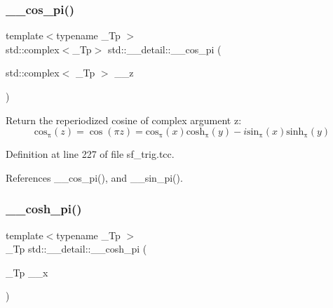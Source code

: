 \mbox{\label{namespacestd_1_1____detail_a0332c7fb29ed7be543103adc8d04d39d}} 
\subsubsection{\texorpdfstring{\+\_\+\+\_\+cos\+\_\+pi()}{\_\_cos\_pi()}\hspace{0.1cm}{\footnotesize\ttfamily [2/2]}}
{\footnotesize\ttfamily template$<$typename \+\_\+\+Tp $>$ \\
std\+::complex$<$\+\_\+\+Tp$>$ std\+::\+\_\+\+\_\+detail\+::\+\_\+\+\_\+cos\+\_\+pi (\begin{DoxyParamCaption}\item[{std\+::complex$<$ \+\_\+\+Tp $>$}]{\+\_\+\+\_\+z }\end{DoxyParamCaption})}

Return the reperiodized cosine of complex argument z\+: \[ \mathrm{cos_\pi}(z) = \cos(\pi z) = \mathrm{cos_\pi}(x) \mathrm{cosh_\pi}(y) - i \mathrm{sin_\pi}(x) \mathrm{sinh_\pi}(y) \] 

Definition at line 227 of file sf\+\_\+trig.\+tcc.



References \+\_\+\+\_\+cos\+\_\+pi(), and \+\_\+\+\_\+sin\+\_\+pi().

\mbox{\label{namespacestd_1_1____detail_ae6e440447e88191b3cd19daaf7fda96e}} 
\subsubsection{\texorpdfstring{\+\_\+\+\_\+cosh\+\_\+pi()}{\_\_cosh\_pi()}\hspace{0.1cm}{\footnotesize\ttfamily [1/2]}}
{\footnotesize\ttfamily template$<$typename \+\_\+\+Tp $>$ \\
\+\_\+\+Tp std\+::\+\_\+\+\_\+detail\+::\+\_\+\+\_\+cosh\+\_\+pi (\begin{DoxyParamCaption}\item[{\+\_\+\+Tp}]{\+\_\+\+\_\+x }\end{DoxyParamCaption})}

